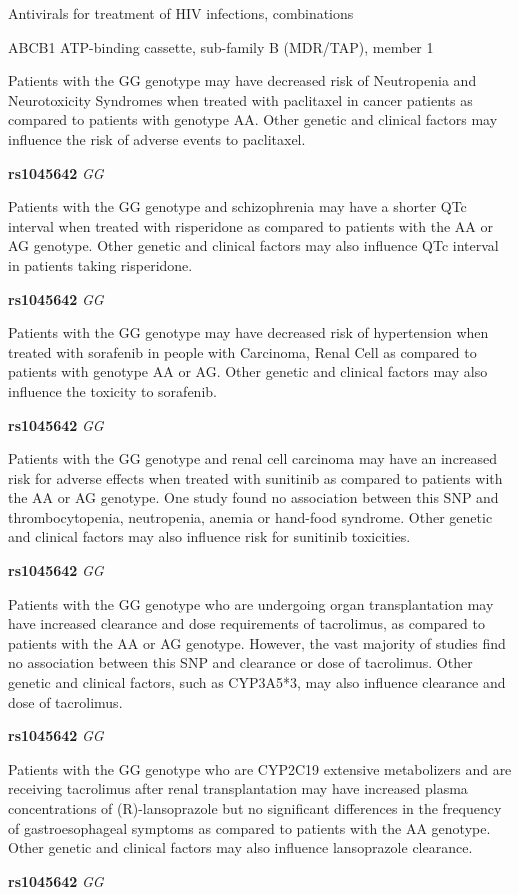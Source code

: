 \documentclass{resume} %
\begin{document}
\begin{rSection}{ Antivirals for treatment of HIV infections, combinations }
\begin{rSubsection}{ ABCB1 }{ ATP-binding cassette, sub-family B (MDR/TAP), member 1 }{}{}
\item[] Patients with the GG genotype may have decreased risk of Neutropenia and Neurotoxicity Syndromes when treated with paclitaxel in cancer patients as compared to patients with genotype AA. Other genetic and clinical factors may influence the risk of adverse events to paclitaxel.\item \textbf{ rs1045642 } \textit{ GG }
\item[] Patients with the GG genotype and schizophrenia may have a shorter QTc interval when treated with risperidone as compared to patients with the AA or AG genotype. Other genetic and clinical factors may also influence QTc interval in patients taking risperidone.\item \textbf{ rs1045642 } \textit{ GG }
\item[] Patients with the GG genotype may have decreased risk of hypertension when treated with sorafenib in people with Carcinoma, Renal Cell as compared to patients with genotype AA or AG. Other genetic and clinical factors may also influence the toxicity to sorafenib.\item \textbf{ rs1045642 } \textit{ GG }
\item[] Patients with the GG genotype and renal cell carcinoma may have an increased risk for adverse effects when treated with sunitinib as compared to patients with the AA or AG genotype. One study found no association between this SNP and thrombocytopenia, neutropenia, anemia or hand-food syndrome. Other genetic and clinical factors may also influence risk for sunitinib toxicities.\item \textbf{ rs1045642 } \textit{ GG }
\item[] Patients with the GG genotype who are undergoing organ transplantation may have increased clearance and dose requirements of tacrolimus, as compared to patients with the AA or AG genotype. However, the vast majority of studies find no association between this SNP and clearance or dose of tacrolimus. Other genetic and clinical factors, such as CYP3A5*3, may also influence clearance and dose of tacrolimus. \item \textbf{ rs1045642 } \textit{ GG }
\item[] Patients with the GG genotype who are CYP2C19 extensive metabolizers and are receiving tacrolimus after renal transplantation may have increased plasma concentrations of (R)-lansoprazole but no significant differences in the frequency of gastroesophageal symptoms as compared to patients with the AA genotype. Other genetic and clinical factors may also influence lansoprazole clearance.\item \textbf{ rs1045642 } \textit{ GG }

\end{rSubsection}
\end{rSection}
\end{document}
